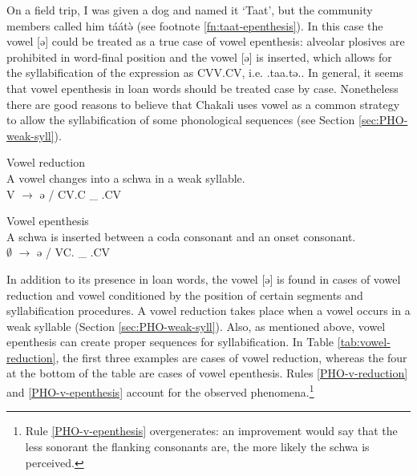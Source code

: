 On a field trip, I was given a dog  and named it  `Taat', but the community members called him {\sls táátə̀} (see footnote \ref{fn:taat-epenthesis}). In this case the  vowel  [{ə}] could be treated as a true case of vowel epenthesis: alveolar plosives are prohibited in word-final position and the   vowel  [{ə}] is  inserted, which allows for the syllabification of the expression as CVV.CV, i.e. {\sls .taa.tə.}.  In general, it seems that vowel epenthesis in loan words should be treated case by case. Nonetheless there are good reasons to believe that Chakali uses vowel  as a common strategy to allow the syllabification of  some phonological sequences (see Section \ref{sec:PHO-weak-syll}). 

\largerpage
\begin{Rule}\label{PHO-v-reduction}{Vowel reduction}\\
A vowel changes into a schwa in a weak syllable.\\
 V  $\rightarrow$ ə /  CV.C \_ .CV
\end{Rule}

\begin{Rule}\label{PHO-v-epenthesis}{Vowel epenthesis}\\
A schwa is inserted between a coda consonant and an onset consonant. \\
$\emptyset$  $\rightarrow$  ə   /  VC. \_  .CV    
\end{Rule}

In addition to its presence in loan words, the   vowel  [{ə}] is found  in cases of vowel reduction  and vowel   conditioned by the position of certain segments and syllabification procedures. A vowel reduction takes place when a vowel occurs in a weak syllable (Section \ref{sec:PHO-weak-syll}).  Also, as  mentioned above, vowel epenthesis can create proper sequences for syllabification.  In Table \ref{tab:vowel-reduction},  the first three examples are cases of vowel reduction, whereas the four at the bottom of the table are cases of vowel epenthesis. Rules \ref{PHO-v-reduction}  and \ref{PHO-v-epenthesis} account for the observed phenomena.\footnote{Rule \ref{PHO-v-epenthesis} overgenerates: an improvement would say that the less sonorant the flanking consonants are, the more likely the schwa is perceived.} 


